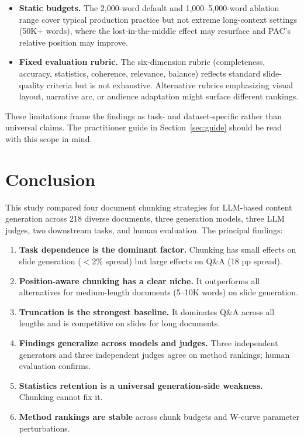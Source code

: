 \documentclass[journal]{IEEEtran}
\begin{document}
\begin{itemize}
    \item \textbf{Static budgets.} The 2{,}000-word default and 1{,}000--5{,}000-word ablation range cover typical production practice but not extreme long-context settings (50K+ words), where the lost-in-the-middle effect may resurface and PAC's relative position may improve.
    \item \textbf{Fixed evaluation rubric.} The six-dimension rubric (completeness, accuracy, statistics, coherence, relevance, balance) reflects standard slide-quality criteria but is not exhaustive. Alternative rubrics emphasizing visual layout, narrative arc, or audience adaptation might surface different rankings.
\end{itemize}

These limitations frame the findings as task- and dataset-specific rather than universal claims. The practitioner guide in Section~\ref{sec:guide} should be read with this scope in mind.

\section{Conclusion}

This study compared four document chunking strategies for LLM-based content generation across 218 diverse documents, three generation models, three LLM judges, two downstream tasks, and human evaluation. The principal findings:

\begin{enumerate}
    \item \textbf{Task dependence is the dominant factor.} Chunking has small effects on slide generation ($<$2\% spread) but large effects on Q\&A (18 pp spread).
    \item \textbf{Position-aware chunking has a clear niche.} It outperforms all alternatives for medium-length documents (5--10K words) on slide generation.
    \item \textbf{Truncation is the strongest baseline.} It dominates Q\&A across all lengths and is competitive on slides for long documents.
    \item \textbf{Findings generalize across models and judges.} Three independent generators and three independent judges agree on method rankings; human evaluation confirms.
    \item \textbf{Statistics retention is a universal generation-side weakness.} Chunking cannot fix it.
    \item \textbf{Method rankings are stable} across chunk budgets and W-curve parameter perturbations.
\end{enumerate}
\end{document}
